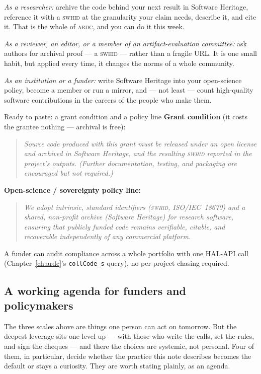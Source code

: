 \emph{As a researcher:} archive the code behind your next result in Software Heritage, reference it
with a \textsc{swhid} at the granularity your claim needs, describe it, and cite it. That is the
whole of \textsc{ardc}, and you can do it this week.

\emph{As a reviewer, an editor, or a member of an artifact-evaluation committee:} ask authors for
archival proof --- a \textsc{swhid} --- rather than a fragile URL. It is one small habit, but applied
every time, it changes the norms of a whole community.

\emph{As an institution or a funder:} write Software Heritage into your open-science policy, become a
member or run a mirror, and --- not least --- count high-quality software contributions in the
careers of the people who make them.

\begin{callout}{Ready to paste: a grant condition and a policy line}
\small \textbf{Grant condition} (it costs the grantee nothing --- archival is free):
\begin{quote}\itshape
Source code produced with this grant must be released under an open license and archived in Software
Heritage, and the resulting \textsc{swhid} reported in the project's outputs. (Further documentation,
testing, and packaging are encouraged but not required.)
\end{quote}
\textbf{Open-science / sovereignty policy line:}
\begin{quote}\itshape
We adopt intrinsic, standard identifiers (\textsc{swhid}, ISO/IEC~18670) and a shared, non-profit
archive (Software Heritage) for research software, ensuring that publicly funded code remains
verifiable, citable, and recoverable independently of any commercial platform.
\end{quote}
A funder can audit compliance across a whole portfolio with one HAL-API call
(Chapter~\ref{ch:ardc}'s \texttt{collCode\_s} query), no per-project chasing required.
\end{callout}

\subsection{A working agenda for funders and policymakers}

The three scales above are things one person can act on tomorrow. But the deepest leverage sits one
level up --- with those who write the calls, set the rules, and sign the cheques --- and there the
choices are systemic, not personal. Four of them, in particular, decide whether the practice this
note describes becomes the default or stays a curiosity. They are worth stating plainly, as an
agenda.

